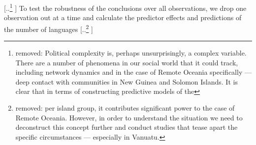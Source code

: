 \documentclass[unnumsec,webpdf,modern,medium]{oup-authoring-template}
\providecommand{\DIFaddtex}[1]{{\protect\color{blue} \sf #1}} %
\providecommand{\DIFdeltex}[1]{{\protect\color{red} [..\footnote{removed: #1} ]}} %
\providecommand{\DIFaddbegin}{} %
\providecommand{\DIFaddend}{} %
\providecommand{\DIFdelbegin}{} %
\providecommand{\DIFdelend}{} %
\providecommand{\DIFadd}[1]{\texorpdfstring{\DIFaddtex{#1}}{#1}} %
\providecommand{\DIFdel}[1]{\texorpdfstring{\DIFdeltex{#1}}{}} %
\newcommand{\DIFscaledelfig}{0.5}
\newlength{\DIFdelgraphicswidth} %
\newlength{\DIFdelgraphicsheight} %
\newcommand{\DIFaddincludegraphics}[2][]{{\color{blue}\fbox{\DIFOincludegraphics[#1]{#2}}}} %
\newcommand{\DIFdelincludegraphics}[2][]{%
\sbox{\DIFdelgraphicsbox}{\DIFOincludegraphics[#1]{#2}}%
\settoboxwidth{\DIFdelgraphicswidth}{\DIFdelgraphicsbox} %
\settoboxtotalheight{\DIFdelgraphicsheight}{\DIFdelgraphicsbox} %
\scalebox{\DIFscaledelfig}{%
\parbox[b]{\DIFdelgraphicswidth}{\usebox{\DIFdelgraphicsbox}\\[-\baselineskip] \rule{\DIFdelgraphicswidth}{0em}}\llap{\resizebox{\DIFdelgraphicswidth}{\DIFdelgraphicsheight}{%
\setlength{\unitlength}{\DIFdelgraphicswidth}%
\begin{picture}(1,1)%
\thicklines\linethickness{2pt} %
{\color[rgb]{1,0,0}\put(0,0){\framebox(1,1){}}}%
{\color[rgb]{1,0,0}\put(0,0){\line( 1,1){1}}}%
{\color[rgb]{1,0,0}\put(0,1){\line(1,-1){1}}}%
\end{picture}%
}\hspace*{3pt}}} %
} %
\DeclareRobustCommand{\DIFaddbegin}{\DIFOaddbegin \let\includegraphics\DIFaddincludegraphics} %
\DeclareRobustCommand{\DIFaddend}{\DIFOaddend \let\includegraphics\DIFOincludegraphics} %
\DeclareRobustCommand{\DIFdelbegin}{\DIFOdelbegin \let\includegraphics\DIFdelincludegraphics} %
\DeclareRobustCommand{\DIFdelend}{\DIFOaddend \let\includegraphics\DIFOincludegraphics} %
\begin{document}
\DIFdel{Political complexity is, perhaps unsurprisingly, a complex variable. There are a number of phenomena in our social world that it could track, including network dynamics and in the case of Remote Oceania specifically --- deep contact with communities in New Guinea and Solomon Islands. It is clear that in terms of constructing predictive models of the }\DIFdelend \DIFaddbegin \DIFadd{To test the robustness of the conclusions over all observations, we drop one observation out at a time and calculate the predictor effects and predictions of the }\DIFaddend number of languages\DIFdelbegin \DIFdel{per island group, it contributes significant power to the case of Remote Oceania. However, in order to understand the situation we need to deconstruct this concept further and conduct studies that tease apart the specific circumstances --- especially in Vanuatu. 
}%




\end{document}
